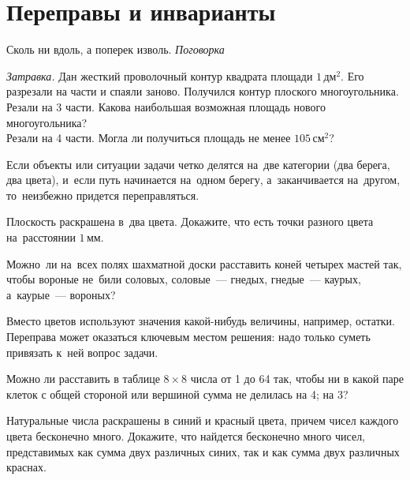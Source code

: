 
\section*{Переправы и инварианты}



\begin{flushright}
    Сколь ни вдоль, а поперек изволь.
    \emph{Поговорка}
\end{flushright}

\begin{problems}

\emph{Затравка.}
Дан жесткий проволочный контур квадрата площади $1\,\text{дм}^2$.
Его разрезали на части и спаяли заново.
Получился контур плоского многоугольника.
\\
\sp
Резали на 3 части.
Какова наибольшая возможная площадь нового многоугольника?
\\
\sp
Резали на 4 части.
Могла ли получиться площадь не менее $105\,\text{см}^2$?

\end{problems}

Если объекты или ситуации задачи четко делятся на~две категории
(два берега, два цвета), и~если путь начинается на~одном берегу,
а~заканчивается на~другом, то~неизбежно придется переправляться.

\begin{problems}

\item
Плоскость раскрашена в~два цвета.
Докажите, что есть точки разного цвета на~расстоянии $1\,\text{мм}$. 

\item
Можно~ли на~всех полях шахматной доски расставить коней четырех мастей так,
чтобы вороные не~били соловых, соловые~--- гнедых, гнедые~--- каурых,
а~каурые~--- вороных?

\end{problems}

Вместо цветов используют значения какой-нибудь величины, например, остатки.
Переправа может оказаться ключевым местом решения: надо только суметь привязать
к~ней вопрос задачи.

\begin{problems}

\item
Можно ли расставить в таблице $8 \times 8$ числа от 1 до 64 так, чтобы
ни в какой паре клеток с общей стороной или вершиной сумма не делилась 
\quad
\sp на 4;
\quad
\sp на 3?

\item
Натуральные числа раскрашены в синий и красный цвета, причем чисел каждого
цвета бесконечно много.
Докажите, что найдется бесконечно много чисел, представимых как сумма двух
различных синих, так и как сумма двух различных краснах.

\end{problems}

